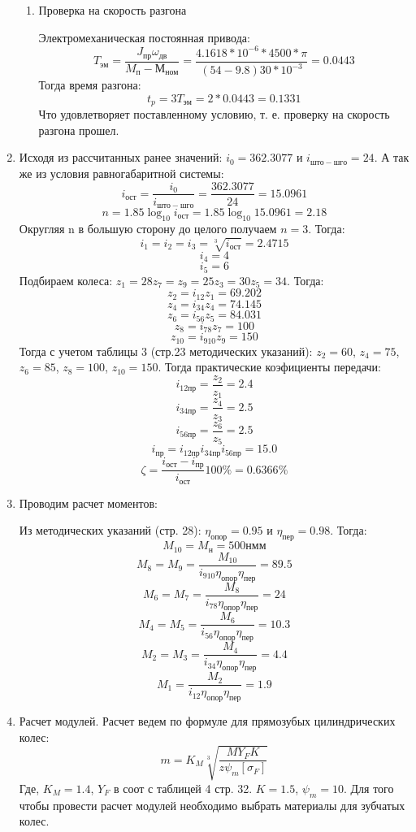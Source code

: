 \documentclass{article}
\begin{document}
\begin{enumerate}
\begin{enumerate}
		\item Проверка на скорость разгона

		Электромеханическая постоянная привода:
		$$
		T_{эм} = \frac{ J_{пр} \omega_{дв}}{M_п - М_{ном}} = \frac{4.1618 * 10^{-6} * 4500 * \pi}{\left(54 - 9.8\right) 30 * 10^{-3}} = 0.0443
		$$
		Тогда время разгона:
		$$
		t_p = 3 T_{эм} = 2 * 0.0443 = 0.1331
		$$
		Что удовлетворяет поставленному условию, т. е. проверку на скорость разгона прошел.
	\end{enumerate}
	\item Исходя из рассчитанных ранее значений: $i_0 = 362.3077$ и $i_{што-шго} = 24$. А так же из условия равногабаритной системы:
	$$
	i_{ост} = \frac{i_0}{i_{што-шго}} = \frac{362.3077}{24} = 15.0961
	$$
	$$
	n = 1.85 \log_{10}{i_{ост}} = 1.85 \log_{10}{15.0961} = 2.18
	$$
	Округляя n в большую сторону до целого получаем $n = 3$. Тогда:
	$$
	i_1 = i_2 = i_3 = \sqrt[3]{i_{ост}} = 2.4715
	$$
	$$
	i_4 = 4
	$$
	$$
	i_5 = 6
	$$
	Подбираем колеса: $z_1 = 28 z_7 = z_9 = 25 z_3 = 30 z_5 = 34$. Тогда:
	$$
	z_2 = i_{12}z_1 = 69.202
	$$
	$$
	z_4 = i_{34}z_4 = 74.145
	$$
	$$
	z_6 = i_{56}z_5 = 84.031
	$$
	$$
	z_8 = i_{78}z_7 = 100
	$$
	$$
	z_{10} = i_{9 10}z_9 = 150
	$$
	Тогда с учетом таблицы 3 (стр.23 методических указаний): $z_2 = 60$, $z_4 = 75$, $z_6 = 85$, $z_8 = 100$, $z_{10} = 150$. Тогда практические коэфициенты передачи:
	$$
	i_{12 пр} = \frac{z_2}{z_1} = 2.4
	$$
	$$
	i_{34 пр} = \frac{z_4}{z_3} = 2.5
	$$
	$$
	i_{56 пр} = \frac{z_6}{z_5} = 2.5
	$$
	$$
	i_{пр} = i_{12 пр} i_{34 пр} i_{56 пр} = 15.0
	$$
	$$
	\zeta = \frac{i_{ост} - i_{пр}}{i_{ост}} 100\% = 0.6366\%
	$$
	\item
	Проводим расчет моментов:

	Из методических указаний (стр. 28): $ \eta_{опор} = 0.95$ и $ \eta_{пер} = 0.98$. Тогда:
	$$
	M_{10} = M_{н} = 500 н мм
	$$
	$$
	M_8 = M_9 = \frac{M_{10}}{i_{9 10} \eta_{опор} \eta_{пер}} = 89.5
	$$
	$$
	M_6 = M_7 = \frac{M_{8}}{i_{78} \eta_{опор} \eta_{пер}} = 24
	$$
	$$
	M_4 = M_5 = \frac{M_{6}}{i_{56} \eta_{опор} \eta_{пер}} = 10.3
	$$
	$$
	M_2 = M_3 = \frac{M_{4}}{i_{34} \eta_{опор} \eta_{пер}} = 4.4
	$$
	$$
	M_1 = \frac{M_{2}}{i_{12} \eta_{опор} \eta_{пер}} = 1.9
	$$
	\item Расчет модулей. Расчет ведем по формуле для прямозубых цилиндрических колес:
	$$
	m = K_M \sqrt[3]{\frac{M Y_F K}{z \psi_m [ \sigma_F]}}
	$$
	Где, $K_M = 1.4$, $Y_F$ в соот с таблицей 4 стр. 32. $K = 1.5$, $ \psi_m = 10 $.
	Для того чтобы провести расчет модулей необходимо выбрать материалы для зубчатых колес.


\end{enumerate}
\end{document}
